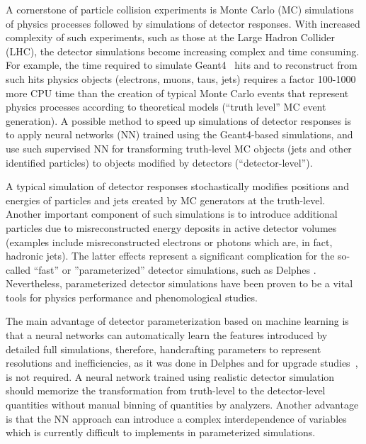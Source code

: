 \documentclass[showpacs,showkeys,preprint,prd,nofootinbib,linenumbers,12pt]{revtex4-1}
\begin{document}
A cornerstone of particle collision experiments is Monte Carlo (MC) simulations of physics processes followed by simulations of detector responses. With increased complexity of such experiments, such as those at the Large Hadron Collider (LHC), the detector simulations become increasing complex and time consuming.  For example, the time required to simulate Geant4~\cite{Agostinelli:2002hh} hits and to reconstruct from such hits physics objects (electrons, muons, taus, jets) requires a factor 100-1000 more CPU time than the creation of typical Monte Carlo events that represent physics processes according to theoretical models (``truth level'' MC event generation).  A possible method to speed up simulations of detector responses is to apply neural networks (NN) trained using the Geant4-based simulations, and use such supervised NN for transforming truth-level MC objects (jets and other identified particles) to objects modified by detectors (``detector-level'').  

A typical simulation of detector responses stochastically modifies positions and energies of particles and jets created by MC generators at the truth-level. Another important component of such simulations is to introduce additional particles due to misreconstructed energy deposits in active detector volumes  (examples include misreconstructed electrons or photons which are, in fact, hadronic jets). The latter effects represent a significant complication for the so-called ``fast'' or ''parameterized'' detector simulations, such as Delphes \cite{deFavereau:2013fsa}. Nevertheless, parameterized detector simulations have been proven to be a vital tools for physics performance and phenomological studies.

The main advantage of detector parameterization based on machine learning is that a neural networks can automatically learn the features introduced by detailed full simulations, therefore, handcrafting parameters to represent resolutions and inefficiencies, as it was done in Delphes and for upgrade studies~\cite{truthSmearingFunction}, is not required. A neural network trained using realistic detector simulation should memorize the transformation from truth-level to the detector-level quantities without manual binning of quantities by analyzers. Another advantage is that the NN approach can introduce a complex interdependence of variables which is currently difficult to implements in parameterized simulations. %
\end{document}
